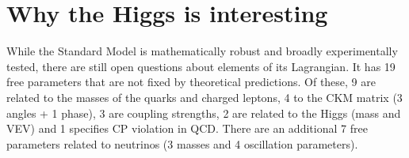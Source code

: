 \section{Why the Higgs is interesting}

While the Standard Model is mathematically robust and broadly experimentally tested, there are still open 
questions about elements of its Lagrangian. It has 19 free parameters that are not fixed by theoretical 
predictions. Of these, 9 are related to the masses of the quarks and charged leptons, 4 to the CKM 
matrix (3 angles + 1 phase), 3 are coupling strengths, 2 are related to the Higgs (mass and VEV) and 1 
specifies CP violation in QCD. There are an additional 7 free parameters related to neutrinos (3 masses and 
4 oscillation parameters). 

